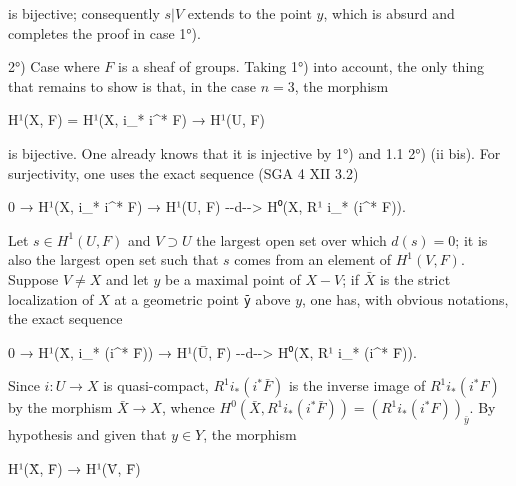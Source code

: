 \documentclass[
  11pt,
  a4paper,
]{book}
\newenvironment{Shaded}{}{}
\newcommand{\NormalTok}[1]{#1}
\begin{document}
is bijective; consequently \(s|V\) extends to the point \(y\), which is
absurd and completes the proof in case 1°).

2°) Case where \(F\) is a sheaf of groups. Taking 1°) into account, the
only thing that remains to show is that, in the case \(n = 3\), the
morphism

\begin{Shaded}
\begin{Highlighting}[]
\NormalTok{H¹(X, F) = H¹(X, i\_* i\^{}* F) → H¹(U, F)}
\end{Highlighting}
\end{Shaded}

is bijective. One already knows that it is injective by 1°) and 1.1 2°)
(ii bis). For surjectivity, one uses the exact sequence (SGA 4 XII 3.2)

\begin{Shaded}
\begin{Highlighting}[]
\NormalTok{0 → H¹(X, i\_* i\^{}* F) → H¹(U, F) {-}{-}d{-}{-}\textgreater{} H⁰(X, R¹ i\_* (i\^{}* F)).}
\end{Highlighting}
\end{Shaded}

Let \(s \in H^{1}(U, F)\) and \(V \supset U\) the largest open set over
which \(d(s) = 0\); it is also the largest open set such that \(s\)
comes from an element of \(H^{1}(V, F)\). Suppose \(V \neq X\) and let
\(y\) be a maximal point of \(X - V\); if \(\bar{X}\) is the strict
localization of \(X\) at a geometric point \texttt{ȳ} above \(y\), one
has, with obvious notations, the exact sequence

\begin{Shaded}
\begin{Highlighting}[]
\NormalTok{0 → H¹(X̄, i\_* (i\^{}* F̄)) → H¹(Ū, F̄) {-}{-}d{-}{-}\textgreater{} H⁰(X̄, R¹ i\_* (i\^{}* F̄)).}
\end{Highlighting}
\end{Shaded}

Since \(i : U \to X\) is quasi-compact, \(R^{1} i_{*} (i^{*} \bar{F})\)
is the inverse image of \(R^{1} i_{*} (i^{*} F)\) by the morphism
\(\bar{X} \to X\), whence
\(H^{0}(\bar{X}, R^{1} i_{*} (i^{*} \bar{F})) = (R^{1} i_{*} (i^{*} F))_{\bar{y}}\).
By hypothesis and given that \(y \in Y\), the morphism

\begin{Shaded}
\begin{Highlighting}[]
\NormalTok{H¹(X̄, F̄) → H¹(V̄, F̄)}
\end{Highlighting}
\end{Shaded}
\end{document}
